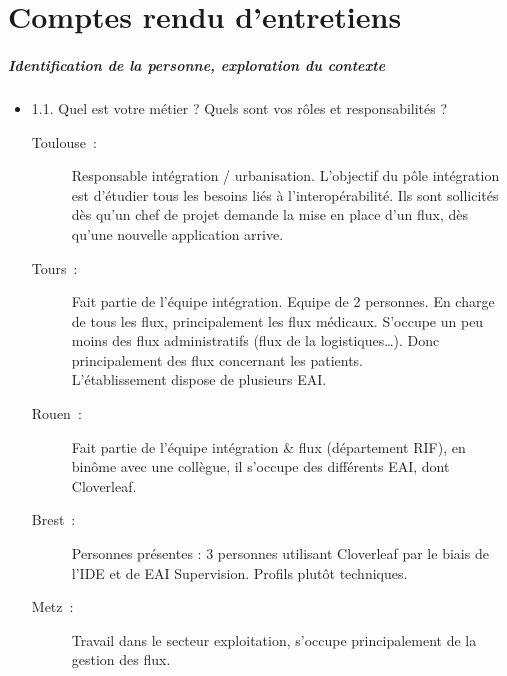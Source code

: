 \chapter{Comptes rendu d'entretiens}
\paragraph{Identification de la personne, exploration du contexte}
	\begin{itemize}
	  \item 1.1. Quel est votre métier ? Quels sont vos rôles et responsabilités ?
	  \begin{description}
	  	\item[Toulouse~:] Responsable intégration / urbanisation. L’objectif du pôle
	  	intégration est d’étudier tous les besoins liés à l’interopérabilité. Ils
	  	sont sollicités dès qu’un chef de projet demande la mise en place d’un
	  	flux, dès qu’une nouvelle application arrive.
	  	\item[Tours~:] Fait partie de l’équipe intégration. Equipe de 2 personnes.
	  	En charge de tous les flux, principalement les flux médicaux. S’occupe un
	  	peu moins des flux administratifs (flux de la logistiques…). Donc
	  	principalement des flux concernant les patients.\\
		L’établissement dispose de plusieurs EAI.
	  	\item[Rouen~:] Fait partie de l’équipe intégration & flux (département RIF),
	  	en binôme avec une collègue, il s’occupe des différents EAI, dont Cloverleaf.
	  	\item[Brest~:] Personnes présentes : 3 personnes utilisant Cloverleaf par le
	  	biais de l’IDE et de EAI Supervision. Profils plutôt techniques.
	  	\item[Metz~:] Travail dans le secteur exploitation, s’occupe principalement
	  	de la gestion des flux.
	  \end{description}
	  

\end{itemize}
